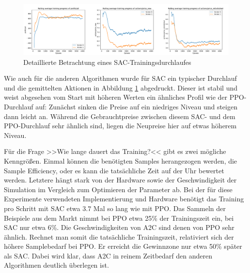\begin{figure}[htbp]
	\centering
	\includegraphics[width=\textwidth]{main/sac_detailed_analysis.pdf}
	\caption{Detaillierte Betrachtung eines SAC-Trainingsdurchlaufes}
	\label{grafic:SACDetails}
\end{figure}

Wie auch für die anderen Algorithmen wurde für SAC ein typischer Durchlauf und die gemittelten Aktionen in Abbildung \ref{grafic:SACDetails} abgedruckt.
Dieser ist stabil und weist abgesehen vom Start mit höheren Werten ein ähnliches Profil wie der PPO-Durchlauf auf:
Zunächst sinken die Preise auf ein niedriges Niveau und steigen dann leicht an.
Während die Gebrauchtpreise zwischen diesem SAC- und dem PPO-Durchlauf sehr ähnlich sind, liegen die Neupreise hier auf etwas höherem Niveau.

Für die Frage >>Wie lange dauert das Training?<< gibt es zwei mögliche Kenngrößen.
Einmal können die benötigten Samples herangezogen werden, die Sample Efficiency, oder es kann die tatsächliche Zeit auf der Uhr bewertet werden.
Letztere hängt stark von der Hardware sowie der Geschwindigkeit der Simulation im Vergleich zum Optimieren der Parameter ab.
Bei der für diese Experimente verwendeten Implementierung und Hardware benötigt das Training pro Schritt mit SAC etwa $3.7$ Mal so lang wie mit PPO.
Das Sammeln der Beispiele aus dem Markt nimmt bei PPO etwa 25\% der Trainingszeit ein, bei SAC nur etwa 6\%.
Die Geschwindigkeiten von A2C sind denen von PPO sehr ähnlich.
Rechnet man somit die tatsächliche Trainingszeit, relativiert sich der höhere Samplebedarf bei PPO.
Er erreicht die Gewinnzone nur etwa 50\% später als SAC.
Dabei wird klar, dass A2C in reinem Zeitbedarf den anderen Algorithmen deutlich überlegen ist.


